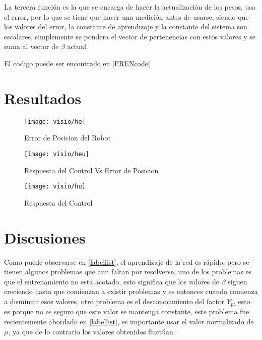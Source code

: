    La tercera función es la que se encarga de hacer la actualización de los pesos, usa el error, por lo que se tiene que hacer una medición antes de usarse, siendo que los valores del error, la constante de aprendizaje y la constante del sistema son escalares, simplemente se pondera el vector de pertenencias con estos valores y se suma al vector de $\beta$ actual.
   
   El codigo puede ser encontrado en \cref{FRENcode}  
   
   \section{Resultados}
   
    
\begin{figure}[h]
	\centering
	\texttt{[image: visio/he]}
	\caption{Error de Posicion del Robot}
	\label{fig:he}
\end{figure}
\begin{figure}[h]
	\centering
		\texttt{[image: visio/heu]}
	\caption{Respuesta del Control Vs Error de Posicion}
	\label{fig:heu}
\end{figure}
\begin{figure}[h]
	\centering
	\texttt{[image: visio/hu]}
	\caption{Respuesta del Control}
	\label{fig:hu}
\end{figure}
    
    
    \section{Discusiones}
    
    Como puede observarse en \ref{labellist}, el aprendizaje de la red es rápido, pero se tienen algunos problemas que aun faltan por resolverse, uno de los problemas es que el entrenamiento no esta acotado, esto significa que los valores de $\beta$ siguen creciendo hasta que comienzan a existir problemas y es entonces cuando comienza a disminuir esos valores, otro problema es el desconocimiento del factor $Y_p$, esto es porque no es seguro que este valor se mantenga constante, este problema fue recientemente abordado en \cref{labellist}, es importante usar el valor normalizado de $\mu$, ya que de lo contrario los valores obtenidos fluctúan.
    